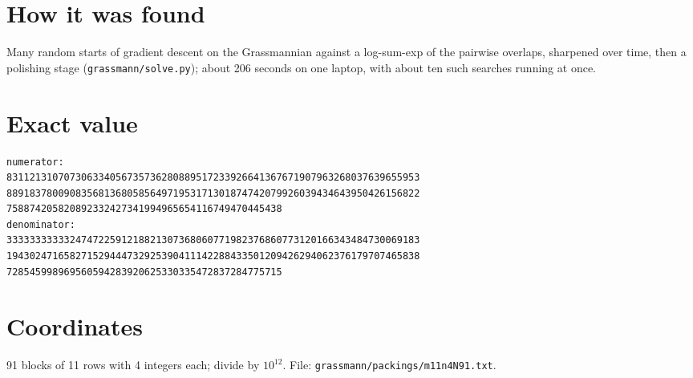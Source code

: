 \documentclass[11pt,a4paper]{article}
\begin{document}
\section{How it was found}
Many random starts of gradient descent on the Grassmannian against a log-sum-exp of the pairwise overlaps, sharpened over time, then a polishing stage (\texttt{grassmann/solve.py}); about 206 seconds on one laptop, with about ten such searches running at once.


\appendix
\section{Exact value}
{\small
\begin{verbatim}
numerator:
831121310707306334056735736280889517233926641367671907963268037639655953
889183780090835681368058564971953171301874742079926039434643950426156822
758874205820892332427341994965654116749470445438
denominator:
333333333332474722591218821307368060771982376860773120166343484730069183
194302471658271529444732925390411142288433501209426294062376179707465838
728545998969560594283920625330335472837284775715
\end{verbatim}}

\section{Coordinates}
91 blocks of 11 rows with 4 integers each; divide by $10^{12}$. File: \texttt{grassmann/packings/m11n4N91.txt}.
{\tiny
\begin{multicols}{3}
\end{multicols}}
\end{document}
